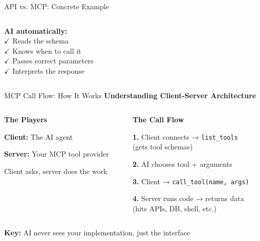 \documentclass[aspectratio=169]{beamer}
\begin{document}
\begin{frame}[fragile]{API vs. MCP: Concrete Example}
\begin{columns}[T]
\begin{column}{0.48\textwidth}
      \vspace{0.2cm}
      \textbf{AI automatically:}\\
      \tiny
      \textcolor{conesaTeal}{$\checkmark$} Reads the schema\\
      \textcolor{conesaTeal}{$\checkmark$} Knows when to call it\\
      \textcolor{conesaTeal}{$\checkmark$} Passes correct parameters\\
      \textcolor{conesaTeal}{$\checkmark$} Interprets the response
    \end{column}
  \end{columns}
\end{frame}

\begin{frame}{MCP Call Flow: How It Works}
  \centering
  \large\bfseries
  Understanding Client-Server Architecture

  \vspace{0.5cm}

  \begin{columns}[T]
    \begin{column}{0.48\textwidth}
      \centering
      \normalsize\bfseries
      \textcolor{conesaTeal}{The Players}

      \vspace{0.3cm}
      \normalsize

      \textbf{Client:} The AI agent

      \textbf{Server:} Your MCP tool provider

      \vspace{0.3cm}
      \small
      Client asks, server does the work
    \end{column}
    \begin{column}{0.48\textwidth}
      \centering
      \normalsize\bfseries
      \textcolor{conesaOrange}{The Call Flow}

      \vspace{0.3cm}
      \normalsize
      \raggedright

      \textbf{1.} Client connects → \texttt{list\_tools}\\
      \small (gets tool schemas)

      \vspace{0.2cm}
      \normalsize
      \textbf{2.} AI chooses tool + arguments

      \vspace{0.2cm}
      \textbf{3.} Client → \texttt{call\_tool(name, args)}

      \vspace{0.2cm}
      \textbf{4.} Server runs code → returns data\\
      \small (hits APIs, DB, shell, etc.)
    \end{column}
  \end{columns}

  \vspace{0.5cm}
  \centering
  \normalsize
  \textbf{Key:} AI never sees your implementation, just the interface
\end{frame}
\end{document}
